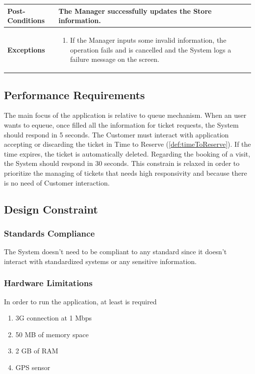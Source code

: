 \documentclass[a4paper, 12pt, oneside]{article}
\begin{document}
\begin{enumerate}[labelindent=20pt, label={UC.\arabic*}, itemindent=1em,leftmargin=!]
\begin{tabularx}{\linewidth}{| l | X |}
    \hline
    \textbf{Post-Conditions} & The Manager successfully updates the Store information.\\
    
    \hline
    \textbf{Exceptions} & \parbox{0.7\textwidth}{ \begin{enumerate}
            \item If the Manager inputs some invalid information, the operation fails and is cancelled and the System logs a failure message on the screen.
        \end{enumerate}}\\

    \hline
    
\end{tabularx}

\subsection{Performance Requirements}
The main focus of the application is relative to queue mechanism.
When an user wants to equeue, once filled all the information for ticket requests, the System should respond in 5 seconds. The Customer must interact with application accepting or discarding the ticket in Time to Reserve  (\ref{def:timeToReserve}). If the time expires, the ticket is automatically deleted.
Regarding the booking of a visit, the System should respond in 30 seconds. This constrain is relaxed in order to prioritize the managing of tickets that needs high responsivity and because there is no need of Customer interaction.

\subsection{Design Constraint}
\subsubsection{Standards Compliance}
The System doesn't need to be compliant to any standard since it doesn't interact with standardized systems or any sensitive information.
\subsubsection{Hardware Limitations}
In order to run the application, at least is required
\begin{enumerate}
    \item 3G connection at 1 Mbps
    \item 50 MB of memory space
    \item 2 GB of RAM
    \item GPS sensor
\end{enumerate}


\end{enumerate}
\end{document}
